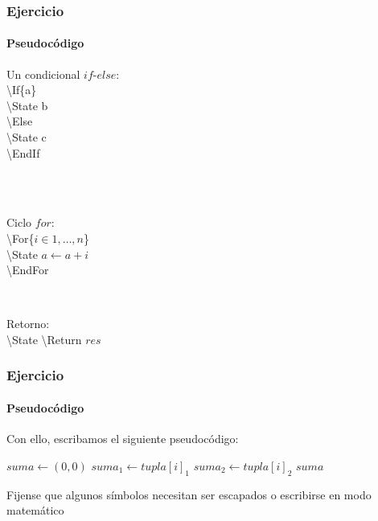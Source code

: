 \begin{frame}
\frametitle{Ejercicio}
\framesubtitle{Pseudocódigo}


\begin{multicols}{2}

\colorbox{color2}{Un condicional $if$-$else$:} \\

\textbackslash If\{a\} \\
\hspace*{15pt} \textbackslash State b \\
\textbackslash Else \\
\hspace*{15pt} \textbackslash State c \\
\textbackslash EndIf \\

\

\

\colorbox{color2}{Ciclo $for$:} \\

\textbackslash For\{$i \in 1,\ldots,n$\} \\
\hspace*{15pt} \textbackslash State $a \gets a + i$ \\
\textbackslash EndFor

\

\colorbox{color2}{Retorno:} \\

\textbackslash State \textbackslash Return $res$ \\


\end{multicols}
\end{frame}

\begin{frame}
\frametitle{Ejercicio}
\framesubtitle{Pseudocódigo}

Con ello, escribamos el siguiente pseudocódigo:

\begin{tcolorbox}[colframe=color1]
\begin{center}
\begin{algorithmic}
        \State $suma \gets (0,0)$
            \State $suma_1 \gets tupla[i]_1$
            \State $suma_2 \gets tupla[i]_2$
        \EndFor
        \EndIf
        \State \Return $suma$
    \EndFunction
\end{algorithmic}
\end{center}
\end{tcolorbox}

Fijense que algunos símbolos necesitan ser escapados o escribirse en modo matemático

\end{frame}